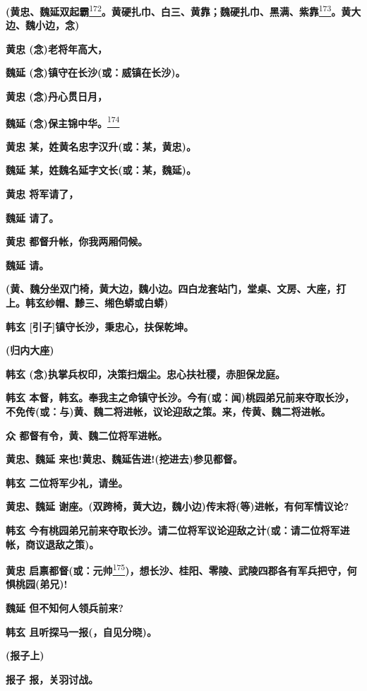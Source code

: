 \textbf{(黄忠、魏延双起霸}\protect\hyperlink{fn172}{\textsuperscript{172}}\textbf{。黄硬扎巾、白三、黄靠；魏硬扎巾、黑满、紫靠}\protect\hyperlink{fn173}{\textsuperscript{173}}\textbf{。黄大边、魏小边，念)}

\textbf{黄忠 (念)老将年高大，}

\textbf{魏延 (念)镇守在长沙(或：威镇在长沙)。}

\textbf{黄忠 (念)丹心贯日月，}

\textbf{魏延
(念)保主锦中华。}\protect\hyperlink{fn174}{\textsuperscript{174}}

\textbf{黄忠 某，姓黄名忠字汉升(或：某，黄忠)。}

\textbf{魏延 某，姓魏名延字文长(或：某，魏延)。}

\textbf{黄忠 将军请了，}

\textbf{魏延 请了。}

\textbf{黄忠 都督升帐，你我两厢伺候。}

\textbf{魏延 请。}

\textbf{(黄、魏分坐双门椅，黄大边，魏小边。四白龙套站门，堂桌、文房、大座，打上。韩玄纱帽、黪三、缃色蟒或白蟒)}

\textbf{韩玄 {[}引子{]}镇守长沙，秉忠心，扶保乾坤。}

\textbf{(归内大座)}

\textbf{韩玄 (念)执掌兵权印，决策扫烟尘。忠心扶社稷，赤胆保龙庭。}

\textbf{韩玄
本督，韩玄。奉我主之命镇守长沙。今有(或：闻)桃园弟兄前来夺取长沙，不免传(或：与)黄、魏二将进帐，议论迎敌之策。来，传黄、魏二将进帐。}

\textbf{众 都督有令，黄、魏二位将军进帐。}

\textbf{黄忠、魏延 来也!黄忠、魏延告进!(挖进去)参见都督。}

\textbf{韩玄 二位将军少礼，请坐。}

\textbf{黄忠、魏延
谢座。(双跨椅，黄大边，魏小边)传末将(等)进帐，有何军情议论?}

\textbf{韩玄
今有桃园弟兄前来夺取长沙。请二位将军议论迎敌之计(或：请二位将军进帐，商议退敌之策)。}

\textbf{黄忠
启禀都督(或：元帅}\protect\hyperlink{fn175}{\textsuperscript{175}}\textbf{)，想长沙、桂阳、零陵、武陵四郡各有军兵把守，何惧桃园(弟兄)!}

\textbf{魏延 但不知何人领兵前来?}

\textbf{韩玄 且听探马一报(，自见分晓)。}

\textbf{(报子上)}

\textbf{报子 报，关羽讨战。}

